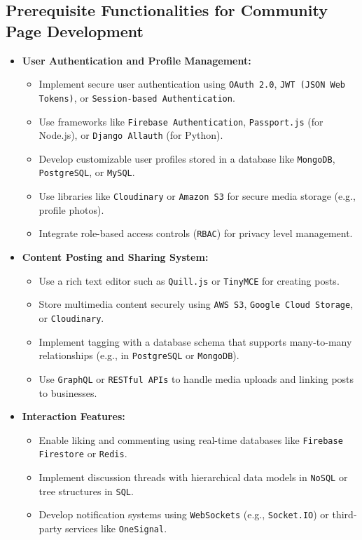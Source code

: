 \subsection{Prerequisite Functionalities for Community Page Development}
\begin{itemize}
    \item \textbf{User Authentication and Profile Management:}
    \begin{itemize}
        \item Implement secure user authentication using \texttt{OAuth 2.0}, \texttt{JWT (JSON Web Tokens)}, or \texttt{Session-based Authentication}.
        \item Use frameworks like \texttt{Firebase Authentication}, \texttt{Passport.js} (for Node.js), or \texttt{Django Allauth} (for Python).
        \item Develop customizable user profiles stored in a database like \texttt{MongoDB}, \texttt{PostgreSQL}, or \texttt{MySQL}.
        \item Use libraries like \texttt{Cloudinary} or \texttt{Amazon S3} for secure media storage (e.g., profile photos).
        \item Integrate role-based access controls (\texttt{RBAC}) for privacy level management.
    \end{itemize}
    
    \item \textbf{Content Posting and Sharing System:}
    \begin{itemize}
        \item Use a rich text editor such as \texttt{Quill.js} or \texttt{TinyMCE} for creating posts.
        \item Store multimedia content securely using \texttt{AWS S3}, \texttt{Google Cloud Storage}, or \texttt{Cloudinary}.
        \item Implement tagging with a database schema that supports many-to-many relationships (e.g., in \texttt{PostgreSQL} or \texttt{MongoDB}).
        \item Use \texttt{GraphQL} or \texttt{RESTful APIs} to handle media uploads and linking posts to businesses.
    \end{itemize}
    
    \item \textbf{Interaction Features:}
    \begin{itemize}
        \item Enable liking and commenting using real-time databases like \texttt{Firebase Firestore} or \texttt{Redis}.
        \item Implement discussion threads with hierarchical data models in \texttt{NoSQL} or tree structures in \texttt{SQL}.
        \item Develop notification systems using \texttt{WebSockets} (e.g., \texttt{Socket.IO}) or third-party services like \texttt{OneSignal}.
    \end{itemize}
    

\end{itemize}
